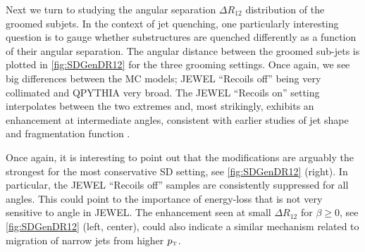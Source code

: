 Next we turn to studying the angular separation $\Delta R_{12}$ distribution of the groomed subjets. In the context of jet quenching, one particularly interesting question is to gauge whether substructures are quenched differently as a function of  their angular separation. The angular distance between the groomed sub-jets is plotted in \autoref{fig:SDGenDR12} for the three grooming settings. Once again, we see big differences between the MC models; JEWEL ``Recoils off'' being very collimated and QPYTHIA very broad. 
The JEWEL ``Recoils on'' setting interpolates between the two extremes and, most strikingly, exhibits an enhancement at intermediate angles, consistent with earlier studies of jet shape and fragmentation function \cite{KunnawalkamElayavalli:2017hxo}.

Once again, it is interesting to point out that the modifications are arguably the strongest for the most conservative SD setting, see \autoref{fig:SDGenDR12} (right). In particular, the JEWEL ``Recoils off'' samples are consistently suppressed for all angles. This could point to the importance of energy-loss that is not very sensitive to angle in JEWEL. The enhancement seen at small $\Delta R_{12}$ for $\beta \geq 0$, see \autoref{fig:SDGenDR12} (left, center), could also indicate a similar mechanism related to migration of narrow jets from higher $p_{\text{\tiny T}}$.


